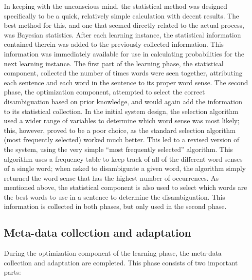 In keeping with the unconscious mind, the statistical method was designed
specifically to be a quick, relatively simple calculation with decent results.
The best method for this, and one that seemed directly related to the actual
process, was Bayesian statistics.  After each learning instance, the statistical
information contained therein was added to the previously collected
information.  This information was immediately available for use in calculating
probabilities for the next learning instance.  The first part of the learning
phase, the statistical component, collected the number of times words were seen
together, attributing each sentence and each word in the sentence to its proper
word sense.  The second
phase, the optimization component, attempted to select
the correct disambiguation based on prior knowledge, and would again add the
information to its statistical collection.  In the initial system design, the selection algorithm 
used a wider range of variables to determine which word sense was most likely;
this, however, proved to be a poor choice, as the standard selection algorithm
(most frequently selected) worked much better.  This led to a revised version of the system, using the very simple
``most frequently selected'' algorithm.  This algorithm
uses a frequency table to keep track of all of the different word senses of a
single word; when asked to disambiguate a given word, the algorithm simply returned the
word sense that has the highest number of occurrences.  As mentioned above, the
statistical component is also used to select which words are the best words to
use in a sentence to determine the disambiguation. This information is collected
in both phases, but only used in the second phase.

\subsection{Meta-data collection and adaptation}

During the optimization component of the learning phase, the meta-data
collection and adaptation are completed.  This phase consists of two important
parts: 

